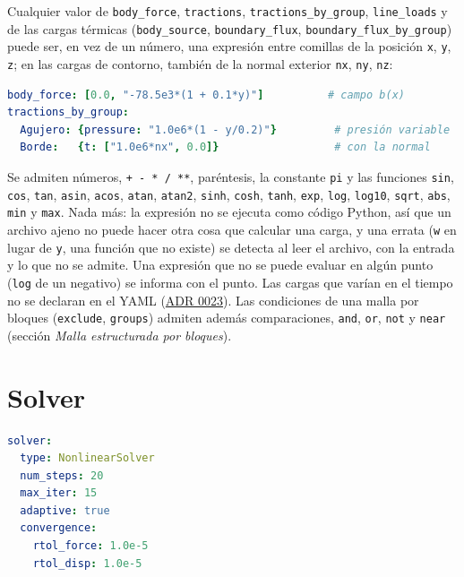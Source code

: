 \documentclass[11pt,oneside]{report}
\begin{document}
Cualquier valor de \texttt{body\_force}, \texttt{tractions}, \texttt{tractions\_\allowbreak{}by\_\allowbreak{}group}, \texttt{line\_loads} y de las cargas térmicas (\texttt{body\_source}, \texttt{boundary\_flux}, \texttt{boundary\_\allowbreak{}flux\_\allowbreak{}by\_\allowbreak{}group}) puede ser, en vez de un número, una expresión entre comillas de la posición \texttt{x}, \texttt{y}, \texttt{z}; en las cargas de contorno, también de la normal exterior \texttt{nx}, \texttt{ny}, \texttt{nz}:

\begin{lstlisting}[language=yaml]
body_force: [0.0, "-78.5e3*(1 + 0.1*y)"]          # campo b(x)
tractions_by_group:
  Agujero: {pressure: "1.0e6*(1 - y/0.2)"}         # presión variable
  Borde:   {t: ["1.0e6*nx", 0.0]}                  # con la normal

\end{lstlisting}

Se admiten números, \texttt{+ - * / **}, paréntesis, la constante \texttt{pi} y las funciones \texttt{sin}, \texttt{cos}, \texttt{tan}, \texttt{asin}, \texttt{acos}, \texttt{atan}, \texttt{atan2}, \texttt{sinh}, \texttt{cosh}, \texttt{tanh}, \texttt{exp}, \texttt{log}, \texttt{log10}, \texttt{sqrt}, \texttt{abs}, \texttt{min} y \texttt{max}. Nada más: la expresión no se ejecuta como código Python, así que un archivo ajeno no puede hacer otra cosa que calcular una carga, y una errata (\texttt{w} en lugar de \texttt{y}, una función que no existe) se detecta al leer el archivo, con la entrada y lo que no se admite. Una expresión que no se puede evaluar en algún punto (\texttt{log} de un negativo) se informa con el punto. Las cargas que varían en el tiempo no se declaran en el YAML (\href{https://github.com/jretamav/solidum-fem/blob/main/docs/adr/0023-cargas-distribuidas-y-expresiones-en-el-yaml.md}{ADR 0023}). Las condiciones de una malla por bloques (\texttt{exclude}, \texttt{groups}) admiten además comparaciones, \texttt{and}, \texttt{or}, \texttt{not} y \texttt{near} (sección \textit{Malla estructurada por bloques}).

\section{Solver}

\begin{lstlisting}[language=yaml]
solver:
  type: NonlinearSolver
  num_steps: 20
  max_iter: 15
  adaptive: true
  convergence:
    rtol_force: 1.0e-5
    rtol_disp: 1.0e-5

\end{lstlisting}
\end{document}

